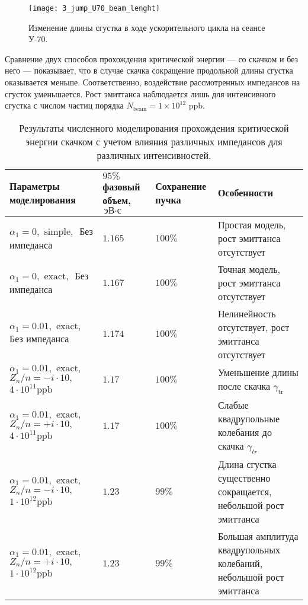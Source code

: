 \begin{figure}
   \centering
   \texttt{[image: 3\_jump\_U70\_beam\_lenght]}
   \caption{Изменение длины сгустка в ходе ускорительного цикла на сеансе У-70.}
   \label{fig:3_jump_U70_beam_lenght}
\end{figure}

\par Сравнение двух способов прохождения критической энергии — со скачком и без него — показывает, что в случае скачка сокращение продольной длины сгустка оказывается меньше. Соответственно, воздействие рассмотренных импедансов на сгусток уменьшается. Рост эмиттанса наблюдается лишь для интенсивного сгустка с числом частиц порядка $N_{\textrm{beam}}=1\times10^{12}$ ppb.

\begin{table}
\begin{center}
\end{center}
\caption{Результаты численного моделирования прохождения критической энергии скачком с учетом влияния различных импедансов для различных интенсивностей.}
\begin{tabular}{| m{4cm} | M{2.5cm} | M{2.5cm} | m{6.6cm} |}
\hline 
Параметры моделирования & $95 \%$ фазовый объем, $\text{эВ}\cdot\text{с}$ & Сохранение пучка & Особенности \\
\hline
$ \alpha_1=0, \text { simple, } $ Без импеданса
 & $1.165$ & $100\%$ &
Простая модель, рост эмиттанса отсутствует \\
\hline
$ \alpha_1=0, \text { exact, } $ Без импеданса
 & $1.167$ & $100\%$ & 
Точная модель, рост эмиттанса отсутствует  \\
\hline
$ \alpha_1=0.01, \text { exact, }$ Без импеданса
 & $1.174$ & $100\%$ & Нелинейность отсутствует, рост эмиттанса отсутствует \\
\hline 
$ \alpha_1=0.01, \text { exact, } $
$ Z_n / n=-i \cdot 10, \quad $
$ 4 \cdot 10^{11} \mathrm{ppb} $
 & $1.17$ & $100\%$ & Уменьшение длины после скачка $\gamma_{\text {tr }}$ \\
\hline 
$ \alpha_1=0.01, \text { exact, } $
$ Z_n / n=+i \cdot 10, \quad $
$ 4 \cdot 10^{11} \mathrm{ppb} $
 & $1.17$ & $100\%$ & Слабые квадрупольные колебания до скачка $\gamma_{t r}$ \\
\hline
$ \alpha_1=0.01, \text { exact, } $
$ Z_n / n=-i \cdot 10, \quad$
$ 1 \cdot 10^{12} \mathrm{ppb} $
 & $1.23$ & $99\%$ & Длина сгустка существенно сокращается, небольшой рост эмиттанса \\
\hline
$ \alpha_1=0.01, \text { exact, } $
$ Z_n / n=+i \cdot 10, \quad$
$ 1 \cdot 10^{12} \mathrm{ppb} $
 & $1.23$ & $99\%$ & Большая амплитуда квадрупольных колебаний, небольшой рост эмиттанса \\
\hline
\end{tabular}
\label{tab:u-70_model}
\end{table}

